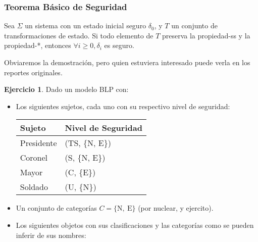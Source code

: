 \documentclass{article}
\theoremstyle{definition}
\newtheorem{exercise}{Ejercicio}
\begin{document}
\subsubsection*{Teorema Básico de Seguridad}
Sea $\Sigma$ un sistema con un estado
inicial seguro $\delta_0$, y $T$ un conjunto de transformaciones de estado. Si
todo elemento de $T$ preserva la propiedad-ss y la propiedad-*, entonces
$\forall i \geq 0, \delta_i$ es seguro.\vspace{.2cm}

Obviaremos la demostración, pero quien estuviera interesado puede verla en los
reportes originales.

\begin{exercise}
Dado un modelo BLP con:
\begin{itemize}
\itemsep0em 
  \item Los siguientes sujetos, cada uno con su respectivo nivel de seguridad:

    \begin{tabular}{l|l}
      Sujeto & Nivel de Seguridad \\
      \hline
      Presidente & (TS, \{N, E\})\\
      Coronel    & (S, \{N, E\})\\
      Mayor      & (C, \{E\})\\
      Soldado    & (U, \{N\})
    \end{tabular}
  \item Un conjunto de categorías $C = \{\text{N},~\text{E}\}$ (por nuclear, y ejercito).
  \item Los siguientes objetos con sus clasificaciones y las categorías como se pueden inferir de sus nombres:


\end{itemize}
\end{exercise}
\end{document}
